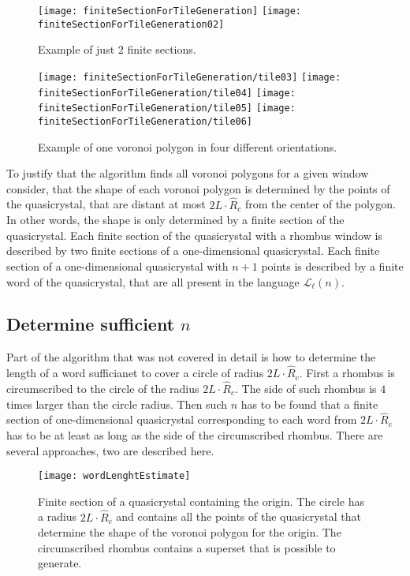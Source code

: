 \documentclass[text.tex]{subfiles}
\begin{document}
\begin{figure}[h]
\centering
\texttt{[image: finiteSectionForTileGeneration]}
\texttt{[image: finiteSectionForTileGeneration02]}
\caption{Example of just $2$ finite sections.}
\label{fig:finiteSectionForTileGeneration}
\end{figure}

\begin{figure}[h]
\centering
\texttt{[image: finiteSectionForTileGeneration/tile03]}
\texttt{[image: finiteSectionForTileGeneration/tile04]}
\texttt{[image: finiteSectionForTileGeneration/tile05]}
\texttt{[image: finiteSectionForTileGeneration/tile06]}
\caption{Example of one voronoi polygon in four different orientations.}
\label{fig:finiteSectionForTileGeneration:more}
\end{figure}

To justify that the algorithm finds all voronoi polygons for a given window consider, that the shape of each voronoi polygon is determined by the points of the quasicrystal, that are distant at most $2L\cdot\hat{R}_c$ from the center of the polygon. In other words, the shape is only determined by a finite section of the quasicrystal. Each finite section of the quasicrystal with a rhombus window is described by two finite sections of a one-dimensional quasicrystal. Each finite section of a one-dimensional quasicrystal with $n+1$ points is described by a finite word of the quasicrystal, that are all present in the language $\mathcal{L}_{\ell}(n)$.

\subsection{Determine sufficient $n$}
Part of the algorithm that was not covered in detail is how to determine the length of a word sufficianet to cover a circle of radius $2L\cdot\hat{R}_c$. First a rhombus is circumscribed to the circle of the radius $2L\cdot\hat{R}_c$. The side of such rhombus is $4$ times larger than the circle radius. Then such $n$ has to be found that a finite section of one-dimensional quasicrystal corresponding to each word from $2L\cdot\hat{R}_c$ has to be at least as long as the side of the circumscribed rhombus. 
There are several approaches, two are described here. 

\begin{figure}[h]
\centering
\texttt{[image: wordLenghtEstimate]}
\caption{Finite section of a quasicrystal containing the origin. The circle has a radius $2L\cdot\hat{R}_c$ and contains all the points of the quasicrystal that determine the shape of the voronoi polygon for the origin. The circumscribed rhombus contains a superset that is possible to generate.}
\label{fig:wordLenghtEstimate}
\end{figure}
\end{document}

